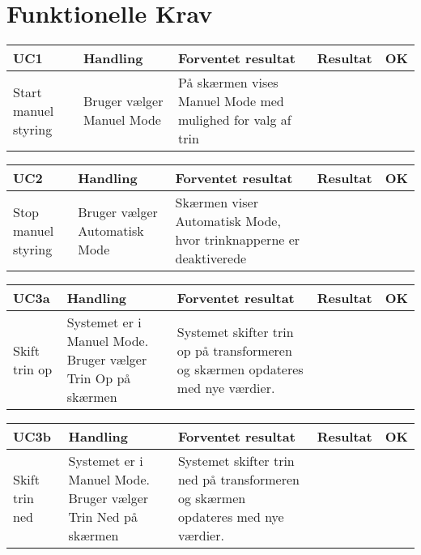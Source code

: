 
\section{Funktionelle Krav}
\begin{table}[htbp]
	\centering
	\begin{tabular}{|p{2cm}|p{3cm}|p{4cm}|p{4.5cm}|p{1cm}|}
		\hline
		\textbf{UC1} & \textbf{Handling} & \textbf{Forventet resultat} & \textbf{Resultat} &\textbf{OK} \\\hline
		Start manuel styring & Bruger vælger Manuel Mode & På skærmen vises Manuel Mode med mulighed for valg af trin &  &  \\\hline
		
		
	\end{tabular}

	
\end{table}

\begin{table}[htbp]
	\centering
	\begin{tabular}{|p{2cm}|p{3cm}|p{4cm}|p{4.5cm}|p{1cm}|}
		\hline
		\textbf{UC2} & \textbf{Handling} & \textbf{Forventet resultat} & \textbf{Resultat} &\textbf{OK} \\\hline
		Stop manuel styring & Bruger vælger Automatisk Mode & Skærmen viser Automatisk Mode, hvor trinknapperne er deaktiverede & &  \\\hline
		
		
	\end{tabular}
\end{table}

\begin{table}[htbp]
	\centering
	\begin{tabular}{|p{2cm}|p{3cm}|p{4cm}|p{4.5cm}|p{1cm}|}
		\hline
		\textbf{UC3a} & \textbf{Handling} & \textbf{Forventet resultat} & \textbf{Resultat} &\textbf{OK} \\\hline
		Skift trin op & Systemet er i Manuel Mode. Bruger vælger Trin Op på skærmen & Systemet skifter trin op på transformeren og skærmen opdateres med nye værdier. &   & \\\hline
		
		
	\end{tabular}
\end{table}

\begin{table}[H]
	\centering
	\begin{tabular}{|p{2cm}|p{3cm}|p{4cm}|p{4.5cm}|p{1cm}|}
		\hline
		\textbf{UC3b} & \textbf{Handling} & \textbf{Forventet resultat} & \textbf{Resultat} &\textbf{OK} \\\hline
		Skift trin ned & Systemet er i Manuel Mode. Bruger vælger Trin Ned på skærmen & Systemet skifter trin ned på transformeren og skærmen opdateres med nye værdier. &  & \\\hline
		
		
	\end{tabular}
	
	
\end{table}